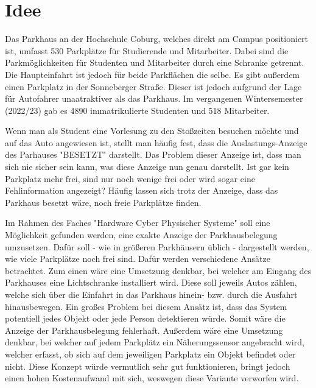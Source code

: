\section{Idee}\label{ch:Einleitung}
Das Parkhaus an der Hochschule Coburg, welches direkt am Campus positioniert ist, umfasst 530 Parkplätze für Studierende und Mitarbeiter.
Dabei sind die Parkmöglichkeiten für Studenten und Mitarbeiter durch eine Schranke getrennt.
Die Haupteinfahrt ist jedoch für beide Parkflächen die selbe.
Es gibt außerdem einen Parkplatz in der Sonneberger Straße.
Dieser ist jedoch aufgrund der Lage für Autofahrer unaatraktiver als das Parkhaus. Im vergangenen Wintersemester (2022/23) gab es 4890 immatrikulierte Studenten und 518 Mitarbeiter.

Wenn man als Student eine Vorlesung zu den Stoßzeiten besuchen möchte und auf das Auto angewiesen ist, stellt man häufig fest, dass die Auslastungs-Anzeige des Parhauses "BESETZT" darstellt.
Das Problem dieser Anzeige ist, dass man sich nie sicher sein kann, was diese Anzeige nun genau darstellt.
Ist gar kein Parkplatz mehr frei, sind nur noch wenige frei oder wird sogar eine Fehlinformation angezeigt?
Häufig lassen sich trotz der Anzeige, dass das Parkhaus besetzt wäre, noch freie Parkplätze finden.

Im Rahmen des Faches "Hardware Cyber Physischer Systeme" soll eine Möglichkeit gefunden werden, eine exakte Anzeige der Parkhausbelegung umzusetzen.
Dafür soll - wie in größeren Parkhäusern üblich - dargestellt werden, wie viele Parkplätze noch frei sind.
Dafür werden verschiedene Ansätze betrachtet.
Zum einen wäre eine Umsetzung denkbar, bei welcher am Eingang des Parkhauses eine Lichtschranke installiert wird.
Diese soll jeweils Autos zählen, welche sich über die Einfahrt in das Parkhaus hinein- bzw. durch die Ausfahrt hinausbewegen.
Ein großes Problem bei diesem Ansätz ist, dass das System potentiell jedes Objekt oder jede Person detektieren würde.
Somit wäre die Anzeige der Parkhausbelegung fehlerhaft.
Außerdem wäre eine Umsetzung denkbar, bei welcher auf jedem Parkplätz ein Näherungssensor angebracht wird, welcher erfasst, ob sich auf dem jeweiligen Parkplatz ein Objekt befindet oder nicht.
Diese Konzept würde vermutlich sehr gut funktionieren, bringt jedoch einen hohen Kostenaufwand mit sich, weswegen diese Variante verworfen wird.

